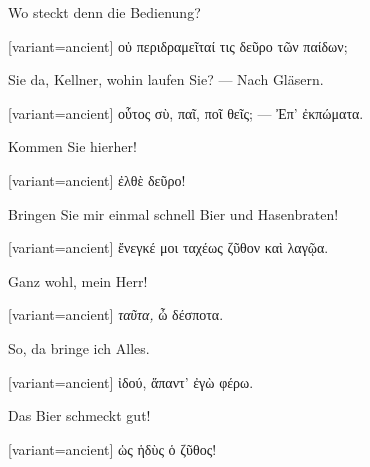 Wo steckt denn die Bedienung?

\switchcolumn

\begin{greek}[variant=ancient]%
οὐ περιδραμεῖταί τις δεῦρο τῶν παίδων;

\end{greek}%
\switchcolumn*

Sie da, Kellner, wohin laufen Sie? --- Nach Gläsern.

\switchcolumn

\begin{greek}[variant=ancient]%
οὗτος σὺ, παῖ, ποῖ θεῖς; --- Ἐπ' ἐκπώματα.

\end{greek}%
\switchcolumn*

Kommen Sie hierher!

\switchcolumn

\begin{greek}[variant=ancient]%
ἐλθὲ δεῦρο!

\end{greek}%
\switchcolumn*

Bringen Sie mir einmal schnell Bier und Hasenbraten!

\switchcolumn

\begin{greek}[variant=ancient]%
ἔνεγκέ μοι ταχέως ζῦθον καὶ λαγῷα.

\end{greek}%
\switchcolumn*

Ganz wohl, mein Herr!

\switchcolumn

\begin{greek}[variant=ancient]%
\emph{ταῦτα,} ὦ δέσποτα.

\end{greek}%
\switchcolumn*

So, da bringe ich Alles.

\switchcolumn

\begin{greek}[variant=ancient]%
ἰδού, ἅπαντ' ἐγὼ φέρω.

\end{greek}%
\switchcolumn*

Das Bier schmeckt gut!

\switchcolumn

\begin{greek}[variant=ancient]%
ὡς ἡδὺς ὁ ζῦθος!

\end{greek}%
\switchcolumn*

